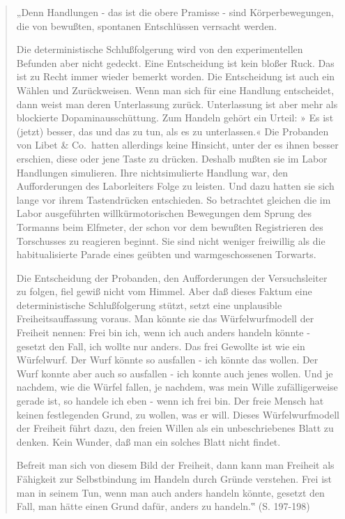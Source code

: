 \documentclass[
  a4paper,
]{report}
\begin{document}
\begin{quote}
„Denn Handlungen - das ist die obere Pramisse - sind Körperbewegungen, die von bewußten, spontanen Entschlüssen verrsacht werden.

Die deterministische Schlußfolgerung wird von den experimentellen Befunden aber nicht gedeckt. Eine Entscheidung ist kein bloßer Ruck. Das ist zu Recht immer wieder bemerkt worden. Die Entscheidung ist auch ein Wählen und Zurückweisen. Wenn man sich für eine Handlung entscheidet, dann weist man deren Unterlassung zurück. Unterlassung ist aber mehr als blockierte Dopaminausschüttung. Zum Handeln gehört ein Urteil: » Es ist (jetzt) besser, das und das zu tun, als es zu unterlassen.« Die Probanden von Libet \& Co.~hatten allerdings keine Hinsicht, unter der es ihnen besser erschien, diese oder jene Taste zu drücken. Deshalb mußten sie im Labor Handlungen simulieren. Ihre nichtsimulierte Handlung war, den Aufforderungen des Laborleiters Folge zu leisten. Und dazu hatten sie sich lange vor ihrem Tastendrücken entschieden. So betrachtet gleichen die im Labor ausgeführten willkürmotorischen Bewegungen dem Sprung des Tormanns beim Elfmeter, der schon vor dem bewußten Registrieren des Torschusses zu reagieren beginnt. Sie sind nicht weniger freiwillig als die habitualisierte Parade eines geübten und warmgeschossenen Torwarts.

Die Entscheidung der Probanden, den Aufforderungen der Versuchsleiter zu folgen, fiel gewiß nicht vom Himmel. Aber daß dieses Faktum eine deterministische Schlußfolgerung stützt, setzt eine unplausible Freiheitsauffassung voraus. Man könnte sie das Würfelwurfmodell der Freiheit nennen: Frei bin ich, wenn ich auch anders handeln könnte - gesetzt den Fall, ich wollte nur anders. Das frei Gewollte ist wie ein Würfelwurf. Der Wurf könnte so ausfallen - ich könnte das wollen. Der Wurf konnte aber auch so ausfallen - ich konnte auch jenes wollen. Und je nachdem, wie die Würfel fallen, je nachdem, was mein Wille zufälligerweise gerade ist, so handele ich eben - wenn ich frei bin. Der freie Mensch hat keinen festlegenden Grund, zu wollen, was er will. Dieses Würfelwurfmodell der Freiheit führt dazu, den freien Willen als ein unbeschriebenes Blatt zu denken. Kein Wunder, daß man ein solches Blatt nicht findet.

Befreit man sich von diesem Bild der Freiheit, dann kann man Freiheit als Fähigkeit zur Selbstbindung im Handeln durch Gründe verstehen. Frei ist man in seinem Tun, wenn man auch anders handeln könnte, gesetzt den Fall, man hätte einen Grund dafür, anders zu handeln.‟ (S. 197-198)
\end{quote}
\end{document}
